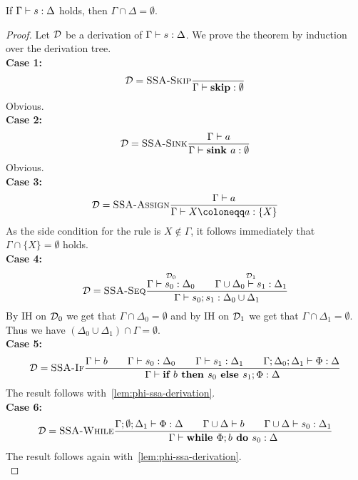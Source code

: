 \begin{theorem}
    \label{thm:gamma-delta-disjoint}
    If $\Gamma \vdash {s}: \Delta$ holds, then $\Gamma \cap \Delta = \emptyset$.
\end{theorem}
\begin{proof}
    Let $\operatorname{\mathcal{D}}$ be a derivation of $\Gamma \vdash {s}: \Delta$.
    We prove the theorem by induction over the derivation tree.\\
    \textbf{Case 1:}
    \begin{align*}
        \operatorname{\mathcal{D}} = \textsc{SSA-Skip}\frac{\displaystyle }{\displaystyle \Gamma \vdash {\textbf{skip}}: \emptyset}
    \end{align*}
    Obvious.\\
    \textbf{Case 2:}
    \begin{align*}
        \operatorname{\mathcal{D}} = \textsc{SSA-Sink}\frac{\displaystyle \Gamma \vdash {a}}{\displaystyle \Gamma \vdash {\textbf{sink }{a}}: \emptyset}
    \end{align*}
    Obvious.\\
    \textbf{Case 3:}
    \begin{align*}
        \D = \rule{SSA-Assign}{\typestmt{\Gamma}{a}}{\typestep{\Gamma}{\defaultstore}{\{X\}}}
    \end{align*}
    As the side condition for the rule is $X \notin \Gamma$, it follows immediately that 
    $\Gamma \cap \{X\} = \emptyset$ holds.\\
    \textbf{Case 4:}
    \begin{align*}
        \operatorname{\mathcal{D}} = \textsc{SSA-Seq}\frac{\displaystyle \overset{\operatorname{\mathcal{D}}_0}{\Gamma \vdash {s_0}: \Delta_0}\qquad
        \overset{\operatorname{\mathcal{D}}_1}{\Gamma \cup \Delta_0 \vdash {s_1}: \Delta_1}}{\displaystyle \Gamma \vdash {{s_0}; {s_1}}: \Delta_0 \cup \Delta_1}
    \end{align*}
    By IH on $\operatorname{\mathcal{D}}_0$ we get that $\Gamma \cap \Delta_0 = \emptyset$ and by IH on 
    $\operatorname{\mathcal{D}}_1$ we get that $\Gamma \cap \Delta_1 = \emptyset$.
    Thus we have $(\Delta_0 \cup \Delta_1) \cap \Gamma = \emptyset$.\\
    \textbf{Case 5:}
    \begin{align*}
        \operatorname{\mathcal{D}} = \textsc{SSA-If}\frac{\displaystyle \Gamma \vdash {b}\qquad
        \Gamma \vdash {s_0}: \Delta_0\qquad \Gamma \vdash {s_1}: \Delta_1\qquad
        \Gamma;\Delta_0;\Delta_1 \vdash {\Phi}: \Delta}{\displaystyle \Gamma \vdash {\textbf{if }{b} \textbf{ then }{s_0}\textbf{ else }{s_1};{\Phi}}: \Delta}
    \end{align*}
    The result follows with~\autoref{lem:phi-ssa-derivation}.\\
    \textbf{Case 6:}
    \begin{align*}
        \operatorname{\mathcal{D}} = \textsc{SSA-While}\frac{\displaystyle \Gamma;\emptyset;\Delta_1 \vdash {\Phi}: \Delta\qquad
        \Gamma \cup \Delta \vdash {b}\qquad\Gamma \cup \Delta \vdash {s_0}: \Delta_1}{\displaystyle \Gamma \vdash {\textbf{while }\Phi;{b} \textbf{ do } {s_0}}: \Delta}
    \end{align*}
    The result follows again with~\autoref{lem:phi-ssa-derivation}.\\
\end{proof}

